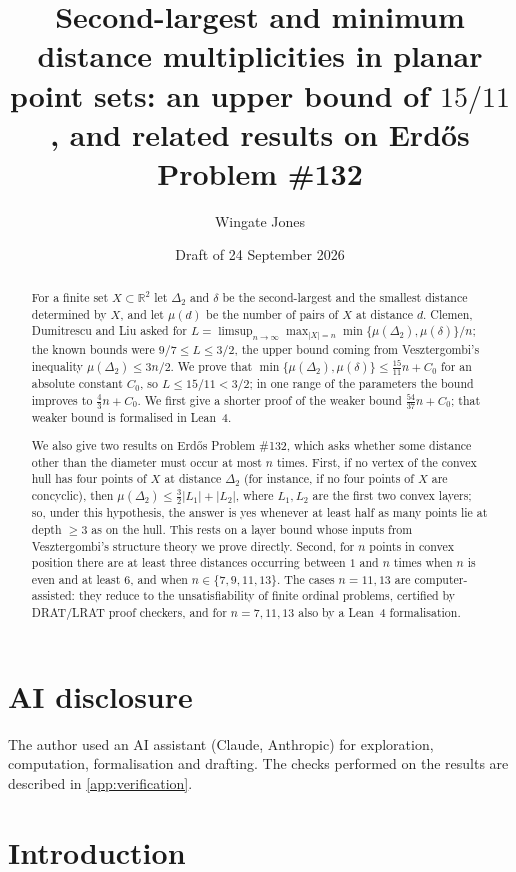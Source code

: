 \documentclass[11pt]{amsart}
\title[Second-largest and minimum distance multiplicities]{Second-largest and minimum distance multiplicities in planar point sets: an upper bound of $15/11$, and related results on Erd\H{o}s Problem \#132}
\author{Wingate Jones}
\date{Draft of 24 September 2026}
\theoremstyle{definition}
\theoremstyle{remark}
\newcommand{\R}{\mathbb{R}}
\newcommand{\Dt}{\Delta_2}
\newcommand{\mult}{\mu}
\begin{document}
\begin{abstract}
For a finite set $X\subset\R^2$ let $\Dt$ and $\delta$ be the second-largest and the smallest distance determined by $X$, and let $\mult(d)$ be the number of pairs of $X$ at distance $d$. Clemen, Dumitrescu and Liu asked for
$L=\limsup_{n\to\infty}\max_{|X|=n}\min\{\mult(\Dt),\mult(\delta)\}/n$; the known bounds were $9/7\le L\le 3/2$, the upper bound coming from Vesztergombi's inequality $\mult(\Dt)\le 3n/2$. We prove that $\min\{\mult(\Dt),\mult(\delta)\}\le \tfrac{15}{11}n+C_0$ for an absolute constant $C_0$, so $L\le 15/11<3/2$; in one range of the parameters the bound improves to $\tfrac43n+C_0$. We first give a shorter proof of the weaker bound $\tfrac{54}{37}n+C_0$; that weaker bound is formalised in Lean~4.

We also give two results on Erd\H{o}s Problem \#132, which asks whether some distance other than the diameter must occur at most $n$ times. First, if no vertex of the convex hull has four points of $X$ at distance $\Dt$ (for instance, if no four points of $X$ are concyclic), then $\mult(\Dt)\le\tfrac32|L_1|+|L_2|$, where $L_1,L_2$ are the first two convex layers; so, under this hypothesis, the answer is yes whenever at least half as many points lie at depth $\ge 3$ as on the hull. This rests on a layer bound whose inputs from Vesztergombi's structure theory we prove directly. Second, for $n$ points in convex position there are at least three distances occurring between $1$ and $n$ times when $n$ is even and at least $6$, and when $n\in\{7,9,11,13\}$. The cases $n=11,13$ are computer-assisted: they reduce to the unsatisfiability of finite ordinal problems, certified by DRAT/LRAT proof checkers, and for $n=7,11,13$ also by a Lean~4 formalisation.
\end{abstract}

\maketitle

\section*{AI disclosure}
The author used an AI assistant (Claude, Anthropic) for exploration, computation, formalisation and drafting. The checks performed on the results are described in \cref{app:verification}.

\section{Introduction}\label{sec:intro}
\end{document}
